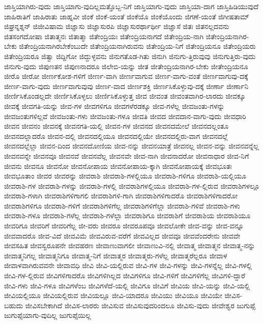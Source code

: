 {ಜಾಸ್ತಿಯಾಗಿರು-ವುದು
ಜಾಸ್ತಿಯಾಗು-ವುದಿಲ್ಲಮತ್ತೊಬ್ಬ-ನಿಗೆ
ಜಾಸ್ತಿಯಾಗು-ವುದು
ಜಾಸ್ತಿಯಾ-ದಾಗ
ಜಾಸ್ತಿಹಿಡಿಯುವುದೆ
ಜಾಹಿರಾತಿಗೆ
ಜಾಹಿರಾತು
ಜಾಹ್ನವೀ
ಜಿಂಕೆ
ಜಿಂಕೆ-ಯಂತೆ
ಜಿಂಕೆಯೊ
ಜಿಂಕೆಯೊಂದು
ಜಿಗಣೆ-ಯಂತೆ
ಜಿಗೀಷತಾಮ್
ಜಿಘ್ರನ್ನಶ್ನನ್
ಜಿಜೀವಿಷಾಮ
ಜಿಜ್ಞಾಸು
ಜಿಜ್ಞಾಸುರಪಿ
ಜಿಜ್ಞಾಸುರರ್ಥಾರ್ಥೀ
ಜಿಜ್ಞಾಸೆ
ಜಿತಃ
ಜಿತನಲ್ಲದವನು
ಜಿತಸಂಗದೋಷಾ
ಜಿತಾತ್ಮನಃ
ಜಿತಾತ್ಮಾ
ಜಿತೇಂದ್ರಿಯಃ
ಜಿತೇಂದ್ರಿಯನಾಗದೆ
ಜಿತೇಂದ್ರಿಯ-ನಾಗಿ
ಜಿತೇಂದ್ರಿಯನಾಗಿರ-ಬೇಕು
ಜಿತೇಂದ್ರಿಯನಾಗಿರಬೇಕೆಂಬುದೇ
ಜಿತೇಂದ್ರಿಯನಾಗಿರುವನು
ಜಿತೇಂದ್ರಿಯ-ನಿಗೆ
ಜಿತೇಂದ್ರಿಯನೂ
ಜಿತೇಂದ್ರಿಯರು
ಜಿತೇಂದ್ರಿಯರೂ
ಜಿತ್ವಾ
ಜಿದ್ದಿಗೋ
ಜಿದ್ದುಳ್ಳವನು
ಜಿನುಗತೊಡ-ಗಿತು
ಜಿನುಗಿ
ಜಿನುಗು-ತ್ತಿರುವುವು
ಜಿನುಗುತ್ತಿರು-ವುದು
ಜಿನುಗು-ವುದು
ಜಿಪುಣತನ
ಜಿಪುಣನಾದರೂ
ಜಿಲೇಬಿ-ಯನ್ನು
ಜೀತ
ಜೀತೇಂದ್ರಿಯನಾಗಿರ-ಬೇಕು
ಜೀತೇಂದ್ರಿಯನೂ
ಜೀರೊ
ಜೀರೋ
ಜೀರ್ಣಕೋಶ-ಗಳಿಗೆ
ಜೀರ್ಣ-ವಾಗಿ
ಜೀರ್ಣವಾಗುವ
ಜೀರ್ಣ-ವಾಗು-ವಂತೆ
ಜೀರ್ಣವಾಗುವು-ದಕ್ಕೆ
ಜೀರ್ಣ-ವಾಗು-ವುದು
ಜೀರ್ಣವಾಗುವುವು
ಜೀರ್ಣ-ವಾದ
ಜೀರ್ಣಶಕ್ತಿ
ಜೀರ್ಣಸಿಕೊಳ್ಳುವು-ದಕ್ಕೆ
ಜೀರ್ಣಾ
ಜೀರ್ಣಾನಿ
ಜೀರ್ಣಿಸಿಕೊಂಡಲ್ಲದೇ
ಜೀರ್ಣಿಸಿಕೊಳ್ಳಲು
ಜೀರ್ಣಿಸಿಕೊಳ್ಳುತ್ತ
ಜೀವ
ಜೀವಂತ
ಜೀವಂತವಾಗಿರ-ಲಾರದು
ಜೀವಕ್ಕೂ
ಜೀವಕ್ಕೆ
ಜೀವಗತಿ-ಯನ್ನು
ಜೀವ-ಗಳ
ಜೀವಗಳಿಗೂ
ಜೀವಗಳೆರಡಕ್ಕೂ
ಜೀವ-ಗಳೆಲ್ಲ
ಜೀವಜಂತು-ಗಳನ್ನು
ಜೀವಜಂತುಗಳಿಲ್ಲವೆ
ಜೀವಜಂತು-ಗಳು
ಜೀವಜಂತು-ಗಳೂ
ಜೀವತಿ
ಜೀವದ
ಜೀವದಾನ-ವಾಗು-ವುದು
ಜೀವಧಾರಿ
ಜೀವನ
ಜೀವನಂ
ಜೀವನಕ್ಕೆ
ಜೀವನಗತಿ-ಯಲ್ಲಿ
ಜೀವನ-ಗಳ
ಜೀವನದ
ಜೀವನದಮೇಲೆ
ಜೀವನದಲ್ಲಂತೂ
ಜೀವನದಲ್ಲಾದರೊ
ಜೀವನ-ದಲ್ಲಿ
ಜೀವನದಲ್ಲಿಯೂ
ಜೀವನದಲ್ಲಿಯೇ
ಜೀವನದಲ್ಲಿರು-ವಾಗ
ಜೀವನದಲ್ಲೆ
ಜೀವನದಲ್ಲೆಲ್ಲಾ
ಜೀವನ-ದಿಂದ
ಜೀವನದೋಣಿಯ
ಜೀವ-ನನ್ನು
ಜೀವನಯಾತ್ರೆ
ಜೀವನಲ್ಲ
ಜೀವನ-ವನ್ನು
ಜೀವನವನ್ನೆಲ್ಲ
ಜೀವನವನ್ನೇ
ಜೀವನವೂ
ಜೀವನವೆ
ಜೀವನವೆಲ್ಲ
ಜೀವನವೇ
ಜೀವ-ನಾಗಿ
ಜೀವನಾದರೋ
ಜೀವನಾಧಾರ
ಜೀವ-ನಿಗೆ
ಜೀವನು
ಜೀವನೂ
ಜೀವನೋ
ಜೀವನೋಪಾಯ
ಜೀವನೋಪಾಯ-ಕ್ಕಾಗಿ
ಜೀವನೋಪಾಯಕ್ಕೆ
ಜೀವಭೂತಃ
ಜೀವಭೂತಾಂ
ಜೀವರ
ಜೀವರನ್ನು
ಜೀವರಾಶಿ
ಜೀವರಾಶಿ-ಗಳಲ್ಲಿಯೂ
ಜೀವರಾಶಿ-ಗಳಿಗೂ
ಜೀವರಾಶಿ-ಯಲ್ಲಿಯೂ
ಜೀವರಾಶಿ-ಗಳ
ಜೀವರಾಶಿ-ಗಳನ್ನು
ಜೀವರಾಶಿ-ಗಳಲ್ಲಿ
ಜೀವರಾಶಿಗಳಲ್ಲಿಯೂ
ಜೀವರಾಶಿ-ಗಳ-ಲ್ಲಿರುವ
ಜೀವರಾಶಿಗಳಲ್ಲೂ
ಜೀವರಾಶಿ-ಗಳಾಗಿ
ಜೀವರಾಶಿಗಳಿಗಾಗಲಿ
ಜೀವರಾಶಿಗಳಿ-ಗಾಗಿ
ಜೀವರಾಶಿಗಳಿಗಾದರೊ
ಜೀವರಾಶಿಗಳಿಗಾದರೋ
ಜೀವರಾಶಿಗಳಿಗೂ
ಜೀವರಾಶಿ-ಗಳಿಗೆ
ಜೀವರಾಶಿಗಳಿಗೆಲ್ಲ
ಜೀವರಾಶಿಗಳಿಗೆಲ್ಲಾ
ಜೀವರಾಶಿ-ಗಳಿವೆ
ಜೀವರಾಶಿ-ಗಳು
ಜೀವರಾಶಿ-ಗಳೂ
ಜೀವರಾಶಿ-ಗಳೆಲ್ಲ
ಜೀವರಾಶಿ-ಗಳೆಲ್ಲಾ
ಜೀವರಾಶಿಗೂ
ಜೀವರಾಶಿಗೆ
ಜೀವರಾಶಿಯ
ಜೀವರಾಶಿಯೂ
ಜೀವರಿಗೂ
ಜೀವರಿಗೆ
ಜೀವರಿಗೆಲ್ಲ
ಜೀ-ವರು
ಜೀವರೂ
ಜೀವರೂಪವೂ
ಜೀವಲೋಕೇ
ಜೀವ-ವನ್ನು
ಜೀವ-ವನ್ನೂ
ಜೀವವಾದರೊ
ಜೀವ-ವಿದೆ
ಜೀವವಿಮೆ
ಜೀವವಿರುವ-ವರೆಗೆ
ಜೀವವಿಲ್ಲದ
ಜೀವವೂ
ಜೀವವೆಂದರೇನು
ಜೀವವೇ
ಜೀವಸಹಿತ
ಜೀವಸ್ವರೂಪನೇ
ಜೀವಹರಣ
ಜೀವಾಣುವಾಗಲೀ
ಜೀವಾಣುವಿ-ನಲ್ಲಿ
ಜೀವಾತ್ಮ
ಜೀವಾತ್ಮನ
ಜೀವಾತ್ಮ-ನನ್ನು
ಜೀವಾತ್ಮನಿಗಲ್ಲ
ಜೀವಾತ್ಮನಿಗೂ
ಜೀವಾತ್ಮ-ನಿಗೆ
ಜೀವಾತ್ಮರ
ಜೀವಾತ್ಮರು-ಗಳೆಲ್ಲ
ಜೀವಾತ್ಮರೆಲ್ಲರೂ
ಜೀವಾಳ
ಜೀವಾಳವಾಗಿರುವವನೇ
ಜೀವಾವಧಿ
ಜೀವಿ
ಜೀವಿ-ಯಲ್ಲಿರುವ
ಜೀವಿ-ಗಳ
ಜೀವಿ-ಗಳನ್ನು
ಜೀವಿ-ಗಳನ್ನೆಲ್ಲ
ಜೀವಿ-ಗಳಲ್ಲಿ
ಜೀವಿ-ಗಳ-ಲ್ಲಿರುವ
ಜೀವಿಗಳಿಗಾದರೊ
ಜೀವಿಗಳಿಗಿಲ್ಲದ
ಜೀವಿಗಳಿಗೂ
ಜೀವಿ-ಗಳಿಗೆ
ಜೀವಿಗಳಿಗೆಲ್ಲ
ಜೀವಿಗಳಿ-ದ್ದಾರೆ
ಜೀವಿ-ಗಳು
ಜೀವಿ-ಗಳೂ
ಜೀವಿಗಳೆಂಬ
ಜೀವಿಗಳೆದೆ-ಯಲ್ಲಿ
ಜೀವಿಗೂ
ಜೀವಿಗೆ
ಜೀವಿಯ
ಜೀವಿ-ಯನ್ನು
ಜೀವಿ-ಯಲ್ಲಿ
ಜೀವಿಯಲ್ಲಿಯೂ
ಜೀವಿಯಲ್ಲಿರುವ
ಜೀವಿಯಲ್ಲೂ
ಜೀವಿ-ಯಾದರೂ
ಜೀವಿಯು
ಜೀವಿಯೂ
ಜೀವಿಯೇ
ಜೀವಿಸ-ಬಹುದು
ಜೀವಿಸಬೇಕಾಗಿದೆ
ಜೀವಿಸ-ಲಾರರು
ಜೀವಿಸುವ
ಜೀವಿಸುವುದರಿಂದಲೂ
ಜೀವಿಸು-ವುದು
ಜೀವೇಶ್ವರ
ಜುಗುಪ್ಸೆ
ಜುಗುಪ್ಸೆಯಾಗು-ವುದಿಲ್ಲ
ಜುಗುಪ್ಸೆಯಿಲ್ಲ
}
